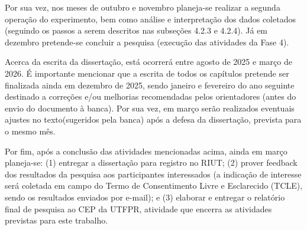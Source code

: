 Por sua vez, nos meses de outubro e novembro planeja-se realizar a segunda operação do experimento, bem como análise e interpretação dos dados coletados (seguindo os passos a serem descritos nas subseções 4.2.3 e 4.2.4). Já em dezembro pretende-se concluir a pesquisa (execução das atividades da Fase 4).

 


Acerca da escrita da dissertação, está ocorrerá entre agosto de 2025 e março de 2026. É importante mencionar que a escrita de todos os capítulos pretende ser finalizada ainda em dezembro de 2025, sendo janeiro e fevereiro do ano seguinte destinado a correções e/ou melhorias recomendadas pelos orientadores (antes do envio do documento à banca). Por sua vez, em março serão realizados eventuais ajustes no texto(sugeridos pela banca) após a defesa da dissertação, prevista para o mesmo mês. 

Por fim, após a conclusão das atividades mencionadas acima, ainda em março planeja-se: (1) entregar a dissertação para registro no RIUT; (2) prover feedback dos resultados da pesquisa aos participantes interessados (a indicação de interesse será coletada em campo do Termo de Consentimento Livre e Esclarecido (TCLE), sendo os resultados enviados por e-mail); e (3) elaborar e entregar o relatório final de pesquisa ao CEP da UTFPR, atividade que encerra as atividades previstas para este trabalho. 
